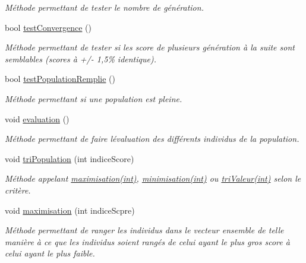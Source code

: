\begin{DoxyCompactItemize}
\begin{DoxyCompactList}\small\item\em Méthode permettant de tester le nombre de génération. \end{DoxyCompactList}\item 
bool \hyperlink{class_population_ae3511322c007fc85a8dd9bda0693b9cf}{test\+Convergence} ()
\begin{DoxyCompactList}\small\item\em Méthode permettant de tester si les score de plusieurs génération à la suite sont semblables (scores à +/-\/ 1,5\% identique). \end{DoxyCompactList}\item 
bool \hyperlink{class_population_a70cec52ba5d29e0f4a1a67a4ae52b276}{test\+Population\+Remplie} ()
\begin{DoxyCompactList}\small\item\em Méthode permettant si une population est pleine. \end{DoxyCompactList}\item 
\mbox{\label{class_population_a023ecf9c1f66140c8b42b4e2bc9755a9}} 
void \hyperlink{class_population_a023ecf9c1f66140c8b42b4e2bc9755a9}{evaluation} ()
\begin{DoxyCompactList}\small\item\em Méthode permettant de faire l\textquotesingle{}évaluation des différents individus de la population. \end{DoxyCompactList}\item 
void \hyperlink{class_population_a15c4b45d033b6af3765f5e86ce43f232}{tri\+Population} (int indice\+Score)
\begin{DoxyCompactList}\small\item\em Méthode appelant \hyperlink{class_population_ae240b80ad4eae0f1b2ec5ec1edcd88c3}{maximisation(int)}, \hyperlink{class_population_a6f27e76b6b15668b343c43c56027515d}{minimisation(int)} ou \hyperlink{class_population_a4b167d07f145a1f1ea69b2bb4cfd2cfb}{tri\+Valeur(int)} selon le critère. \end{DoxyCompactList}\item 
void \hyperlink{class_population_ae240b80ad4eae0f1b2ec5ec1edcd88c3}{maximisation} (int indice\+Scpre)
\begin{DoxyCompactList}\small\item\em Méthode permettant de ranger les individus dans le vecteur ensemble de telle manière à ce que les individus soient rangés de celui ayant le plus gros score à celui ayant le plus faible. \end{DoxyCompactList}\item 

\end{DoxyCompactItemize}
